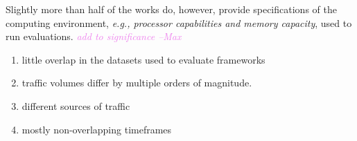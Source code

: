 \documentclass[manuscript,nonacm]{acmart}
\newcommand{\maxnote}[1]{\textit{\textcolor{violet}{#1 --Max}}}
\begin{document}
Slightly more than half of the works do, however, provide specifications of the computing environment, \textit{e.g., processor capabilities and memory capacity}, used to run evaluations.
\maxnote{add to significance}

\begin{enumerate}
    \item little overlap in the datasets used to evaluate frameworks
    \item traffic volumes differ by multiple orders of magnitude.
    \item different sources of traffic
    \item mostly non-overlapping timeframes
\end{enumerate}
\end{document}
